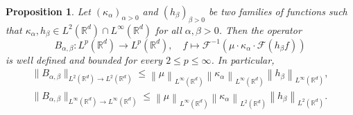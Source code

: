 \documentclass{article}
\newtheorem{proposition}[theorem]{Proposition}
\theoremstyle{definition}
\newcommand{\R}{\mathbb{R}}
\newcommand{\norm}[1]{\left\lVert#1\right\rVert}
\newcommand{\fourier}{\mathcal{F}}
\begin{document}
\begin{proposition}
    Let \((\kappa_\alpha)_{\alpha>0}\)
    and
    \((h_\beta)_{\beta>0}\)
    be two families of functions such that 
    \(\kappa_\alpha, h_\beta \in L^2(\R^d) \cap L^\infty(\R^d)\)
    for all
    \(\alpha,\beta >0\).
    Then the operator
    \begin{equation*}
        B_{\alpha,\beta}\colon
        L^p(\R^d)\to L^p(\R^d),
        \quad
        f\mapsto
        \fourier^{-1}\left(
        \mu\cdot 
        \kappa_\alpha
        \cdot 
        \fourier\left({h_\beta} f\right)
        \right)        
    \end{equation*}
    is well defined and bounded for every \(2\leq p\leq \infty\). In particular,
    \begin{align*}
        \|B_{\alpha,\beta}\|_{L^2(\R^d)\to L^2(\R^d)}\le \norm{
    \mu
    }_{L^\infty(\R^d)}
    \norm{
    \kappa_\alpha
    }_{L^\infty(\R^d)}
    \norm{
    {h_\beta}
    }_{L^\infty(\R^d)},\\
    \|B_{\alpha,\beta}\|_{L^\infty(\R^d)\to L^\infty(\R^d)}\le
    \norm{
    \mu
    }_{L^\infty(\R^d)}
    \norm{
    \kappa_\alpha
    }_{L^2(\R^d)}
    \norm{
    {h_\beta}
    }_{L^2(\R^d)}.
    \end{align*}
\end{proposition}
\clearpage
\end{document}
